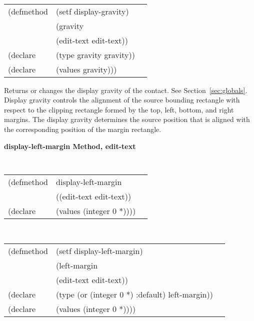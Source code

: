 \begin{flushright} \parbox[t]{6.125in}{
\tt
\begin{tabular}{lll}
\raggedright
(defmethod & (setf display-gravity) & \\
         & (gravity \\
         & (edit-text  edit-text)) \\
(declare &(type gravity  gravity))\\
(declare & (values gravity)))
\end{tabular}
\rm}
\end{flushright}

\begin{flushright} \parbox[t]{6.125in}{
Returns or changes the display gravity of the contact.
See Section~\ref{sec:globals}. Display gravity controls the alignment of the
source bounding rectangle with respect to the clipping rectangle formed by the
top, left, bottom, and right margins. The display gravity determines the source
position that is aligned with the corresponding position of the margin
rectangle.  
}
\end{flushright}




{\samepage  
{\large {\bf display-left-margin \hfill Method, edit-text}}
\begin{flushright} \parbox[t]{6.125in}{
\tt
\begin{tabular}{lll}
\raggedright
(defmethod & display-left-margin & \\
& ((edit-text  edit-text)) \\
(declare & (values (integer 0 *))))
\end{tabular}
\rm

}\end{flushright}}

\begin{flushright} \parbox[t]{6.125in}{
\tt
\begin{tabular}{lll}
\raggedright
(defmethod & (setf display-left-margin) & \\
         & (left-margin \\
         & (edit-text  edit-text)) \\
(declare &(type (or (integer 0 *) :default)  left-margin))\\
(declare & (values (integer 0 *))))
\end{tabular}
\rm}
\end{flushright}

